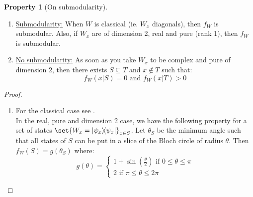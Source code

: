 \documentclass{article}
\theoremstyle{definition}
\newtheorem{prop}[theo]{Property}
\theoremstyle{remark}
\begin{document}
\begin{prop}[On submodularity]
  \label{pureReal2submod}
    \begin{enumerate}[label={(\arabic*)}]
  \item \underline{Submodularity:} When $W$ is classical (ie. $W_x$ diagonals), then $f_W$ is submodular. Also, if $W_x$ are of dimension 2, real and pure (rank 1), then $f_W$ is submodular.
  \item \underline{No submodularity:} As soon as you take $W_x$ to be complex and pure of dimension 2, then there exists $S \subseteq T$ and $x \not\in T$ such that:
    \[f_W(x|S) = 0 \text{ and } f_W(x|T) > 0\]
  \end{enumerate}
\end{prop}
\begin{proof}
    \begin{enumerate}[label={(\arabic*)}]
    \item For the classical case see \cite{BF17}.\\
      
      In the real, pure and dimension 2 case, we have the following property for a set of states $\set{W_x = \dyad{\psi_x}}_{x \in S}$. Let $\theta_S$ be the minimum angle such that all states of $S$ can be put in a slice of the Bloch circle of radius $\theta$. Then $f_W(S) = g(\theta_S)$ where:
      \[
      g(\theta)=\begin{cases}
      1 + \sin(\frac{\theta}{2}) \text{ if } 0 \leq \theta \leq \pi\\
      2 \text{ if } \pi \leq \theta \leq 2\pi
      \end{cases}
      \]

      \begin{center}
      \end{center}
      

\end{enumerate}
\end{proof}
\end{document}
